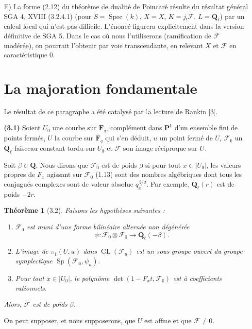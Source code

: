 \documentclass[12pt,a4paper]{amsart}
\theoremstyle{plain}
\newtheorem{theoreme}{Th\'eor\`eme}[section]
\theoremstyle{definition}
\theoremstyle{remark}
\DeclareMathOperator{\Sp}{Sp}
\DeclareMathOperator{\GL}{GL}
\DeclareMathOperator{\Spec}{Spec}
\newcommand{\Q}{\mathbf{Q}}
\newcommand{\F}{\mathbf{F}}
\numberwithin{equation}{section}
\begin{document}
\noindent E) La forme (2.12) du th\'eor\`eme de dualit\'e de Poincar\'e r\'esulte du r\'esultat g\'en\'eral SGA 4, XVIII (3.2.4.1) (pour $S=\Spec(k)$, $X=X$, $K=j_!\mathscr{F}$, $L=\Q_\ell$) par un calcul local qui n'est pas difficile. L'\'enonc\'e figurera explicitement dans la version d\'efinitive de SGA 5. Dans le cas o\`u nous l'utiliserons (ramification de $\mathscr{F}$ mod\'er\'ee), on pourrait l'obtenir par voie transcendante, en relevant $X$ et $\mathscr{F}$ en caract\'eristique $0$.


\section{La majoration fondamentale}

Le r\'esultat de ce paragraphe a \'et\'e catalys\'e par la lecture de Rankin [3].

\noindent \textbf{(3.1)} Soient $U_0$ une courbe sur $\F_q$, compl\'ement dans $\mathbf{P}^1$ d'un ensemble fini de points ferm\'es, $U$ la courbe sur $\overline{\F}_q$ qui s'en d\'eduit, $u$ un point ferm\'e de $U$, $\mathscr{F}_0$ un $\Q_\ell$-faisceau constant tordu sur $U_0$ et $\mathscr{F}$ son image r\'eciproque sur $U$.

Soit $\beta\in\Q$. Nous dirons que $\mathscr{F}_0$ est de poids $\beta$ si pour tout $x\in|U_0|$, les valeurs propres de $F_x$ agissant sur $\mathscr{F}_0$ (1.13) sont des nombres alg\'ebriques dont tous les conjugu\'es complexes sont de valeur absolue $q_x^{\beta/2}$. Par exemple, $\Q_\ell(r)$ est de poids $-2r$.

\begin{theoreme}[3.2]\label{thm:3.2}
Faisons les hypoth\`eses suivantes :
\begin{enumerate}
\item[(i)] $\mathscr{F}_0$ est muni d'une forme bilin\'eaire altern\'ee non d\'eg\'en\'er\'ee
\[
\psi : \mathscr{F}_0 \otimes \mathscr{F}_0 \longrightarrow \Q_\ell(-\beta).
\]
\item[(ii)] L'image de $\pi_1(U,u)$ dans $\GL(\mathscr{F}_u)$ est un sous-groupe ouvert du groupe symplectique $\Sp(\mathscr{F}_u,\psi_u)$.
\item[(iii)] Pour tout $x\in|U_0|$, le polyn\^ome $\det(1-F_x t,\mathscr{F}_0)$ est \`a coefficients rationnels.
\end{enumerate}
Alors, $\mathscr{F}$ est de poids $\beta$.
\end{theoreme}

On peut supposer, et nous supposerons, que $U$ est affine et que $\mathscr{F}\not=0$.
\end{document}

